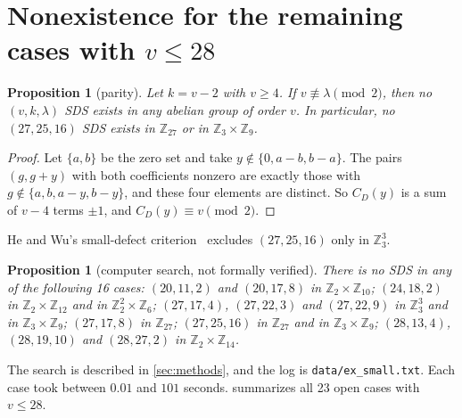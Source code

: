 \documentclass[11pt]{article}
\numberwithin{equation}{section}
\newtheorem{proposition}[theorem]{Proposition}
\theoremstyle{definition}
\theoremstyle{remark}
\newcommand{\Z}{\mathbb Z}
\begin{document}
\section{Nonexistence for the remaining cases with \texorpdfstring{$v\le 28$}{v <= 28}}\label{sec:nonex}

\begin{proposition}[parity]\label{prop:parity}
Let $k=v-2$ with $v\ge 4$. If $v\not\equiv\lambda\pmod 2$, then no $(v,k,\lambda)$ SDS exists in
any abelian group of order $v$. In particular, no $(27,25,16)$ SDS exists in $\Z_{27}$ or in
$\Z_3\times\Z_9$.
\end{proposition}
\begin{proof}
Let $\{a,b\}$ be the zero set and take $y\notin\{0,a-b,b-a\}$. The pairs $(g,g+y)$ with both
coefficients nonzero are exactly those with $g\notin\{a,b,a-y,b-y\}$, and these four elements are
distinct. So $C_D(y)$ is a sum of $v-4$ terms $\pm1$, and $C_D(y)\equiv v\pmod 2$.
\end{proof}
He and Wu's small-defect criterion~\cite[Thm.~4.7]{HeWu2026} excludes $(27,25,16)$ only in
$\Z_3^3$.

\begin{proposition}[computer search, not formally verified]\label{prop:computer}
There is no SDS in any of the following 16 cases:
$(20,11,2)$ and $(20,17,8)$ in $\Z_2\times\Z_{10}$;
$(24,18,2)$ in $\Z_2\times\Z_{12}$ and in $\Z_2^2\times\Z_6$;
$(27,17,4)$, $(27,22,3)$ and $(27,22,9)$ in $\Z_3^3$ and in $\Z_3\times\Z_9$;
$(27,17,8)$ in $\Z_{27}$;
$(27,25,16)$ in $\Z_{27}$ and in $\Z_3\times\Z_9$;
$(28,13,4)$, $(28,19,10)$ and $(28,27,2)$ in $\Z_2\times\Z_{14}$.
\end{proposition}

The search is described in \cref{sec:methods}, and the log is \texttt{data/ex\_small.txt}. Each
case took between $0.01$ and $101$ seconds.  summarizes all 23 open cases with
$v\le28$.
\end{document}

